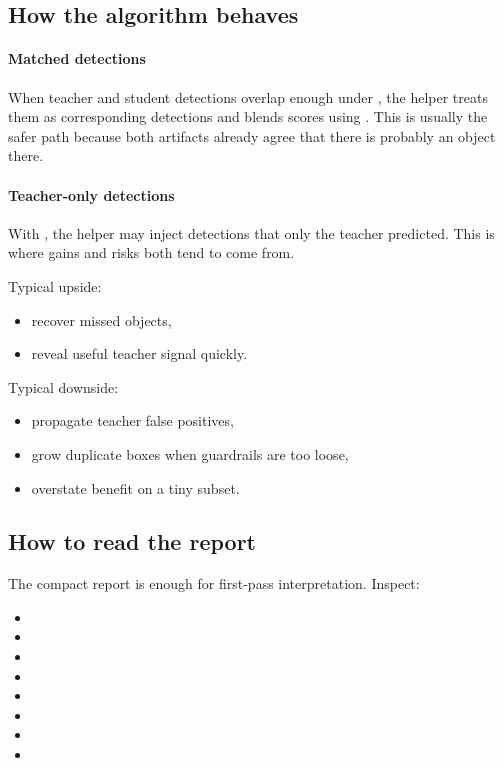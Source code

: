 \subsection{How the algorithm behaves}
\paragraph{Matched detections}
When teacher and student detections overlap enough under , the helper treats them as corresponding detections and blends scores using .
This is usually the safer path because both artifacts already agree that there is probably an object there.

\paragraph{Teacher-only detections}
With , the helper may inject detections that only the teacher predicted.
This is where gains and risks both tend to come from.

Typical upside:
\begin{itemize}
  \item recover missed objects,
  \item reveal useful teacher signal quickly.
\end{itemize}

Typical downside:
\begin{itemize}
  \item propagate teacher false positives,
  \item grow duplicate boxes when guardrails are too loose,
  \item overstate benefit on a tiny subset.
\end{itemize}

\subsection{How to read the report}
The compact report is enough for first-pass interpretation.
Inspect:
\begin{itemize}
  \item {}
  \item {}
  \item {}
  \item {}
  \item {}
  \item {}
  \item {}
  \item {}
\end{itemize}


